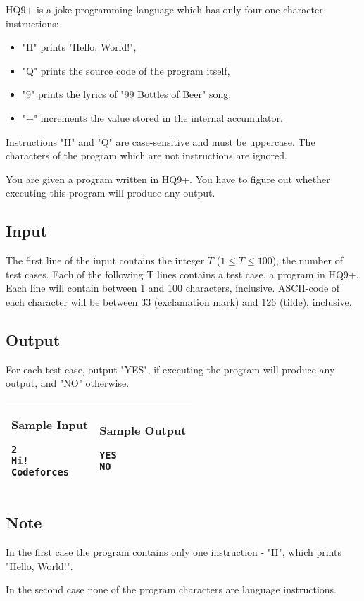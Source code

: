 HQ9+ is a joke programming language which has only four one-character instructions:

\begin{itemize}
    \item "H" prints "Hello, World!",

    \item "Q" prints the source code of the program itself,

    \item "9" prints the lyrics of "99 Bottles of Beer" song,

    \item "+" increments the value stored in the internal accumulator.
\end{itemize}

Instructions "H" and "Q" are case-sensitive and must be uppercase. The
characters of the program which are not instructions are ignored.

You are given a program written in HQ9+. You have to figure out whether
executing this program will produce any output.

\subsection*{Input}

The first line of the input contains the integer $T$ ($1 \leq T \leq 100$),
the number of test cases.
Each of the following T lines contains a test case, a program in HQ9+.
Each line will contain between 1 and 100 characters, inclusive. ASCII-code of
each character will be between 33 (exclamation mark) and 126 (tilde),
     inclusive.

\subsection*{Output}

For each test case, output "YES", if executing the program will produce any
output, and "NO" otherwise.

\begin{table}[!h]
\centering
\begin{tabular}{|l|l|}
\hline
\begin{minipage}[t]{3in}
\textbf{Sample Input}
\begin{verbatim}
2
Hi!
Codeforces
\end{verbatim}
\vspace{1mm}
\end{minipage}
&

\begin{minipage}[t]{3in}
\textbf{Sample Output}
\begin{verbatim}
YES
NO
\end{verbatim}
\vspace{1mm}
\end{minipage} \\
\hline
\end{tabular}
\end{table}

\subsection*{Note}
In the first case the program contains only one instruction - "H", which prints "Hello, World!".

In the second case none of the program characters are language instructions.

\newpage
